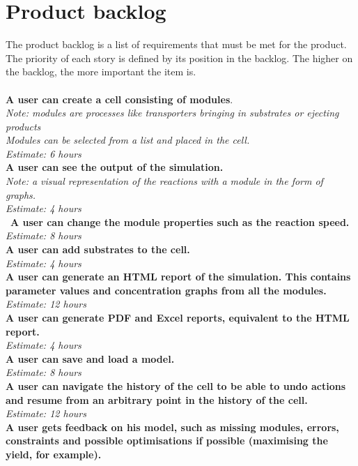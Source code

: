 \documentclass[10pt,a4paper]{report}
\begin{document}
	\section{Product backlog}
		The product backlog is a list of requirements that must be met for the product. The priority of each story is defined by its position in the backlog. The higher on the backlog, the more important the item is.\\
		\\
		\textbf{A user can create a cell consisting of modules}. \\
		\indent
			\textit{Note: modules are processes like transporters bringing in substrates or ejecting products\\
		\indent
			Modules can be selected from a list and placed in the cell.\\
		\indent
			Estimate: 6 hours} \\
		\textbf{A user can see the output of the simulation. }\\
		\indent
			\textit{Note: a visual representation of the reactions with a module in the form of graphs. \\
		\indent
			Estimate: 4 hours} \\\
		\textbf{A user can change the module properties such as the reaction speed.} \\
		\indent
			\emph{Estimate: 8 hours} \\
		\textbf{A user can add substrates to the cell.} \\
		\indent
			\emph{Estimate: 4 hours} \\
		\textbf{A user can generate an HTML report of the simulation. This contains parameter values and concentration graphs from all the modules.} \\
		\indent
			\emph{ Estimate: 12 hours} \\
		\textbf{A user can generate PDF and Excel reports, equivalent to the HTML report.} \\
		\indent
			\emph{Estimate: 4 hours} \\
		\textbf{A user can save and load a model.} \\
		\indent
			\emph{Estimate: 8 hours} \\
		\textbf{A user can navigate the history of the cell to be able to undo actions and resume from an arbitrary point in the history of the cell.}\\
		\indent
			\emph{Estimate: 12 hours}\\
		\textbf{A user gets feedback on his model, such as missing modules, errors, constraints and possible optimisations if possible (maximising the yield, for example).} \\
\end{document}
